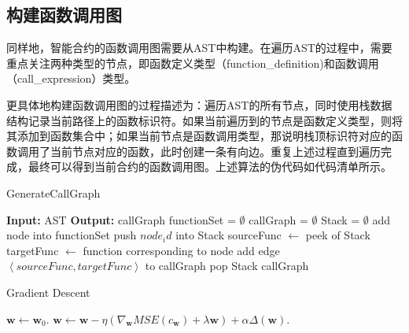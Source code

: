 \subsection{构建函数调用图}
\label{sec:构建函数调用图}
同样地，智能合约的函数调用图需要从AST中构建。在遍历AST的过程中，需要重点关注两种类型的节点，即函数定义类型（function\_definition)和函数调用（call\_expression）类型。

更具体地构建函数调用图的过程描述为：遍历AST的所有节点，同时使用栈数据结构记录当前路径上的函数标识符。如果当前遍历到的节点是函数定义类型，则将其添加到函数集合中；如果当前节点是函数调用类型，那说明栈顶标识符对应的函数调用了当前节点对应的函数，此时创建一条有向边。重复上述过程直到遍历完成，最终可以得到当前合约的函数调用图。上述算法的伪代码如代码清单所示。


\begin{algorithm}
    \caption{GenerateCallGraph}
    \begin{algorithmic}[1]
        \State \textbf{Input:} AST
        \State \textbf{Output:} callGraph
        \State functionSet = $\emptyset$
        \State callGraph = $\emptyset$
        \State Stack = $\emptyset$
                \State add node into functionSet
                \State push $node_id$ into Stack
                    \State sourceFunc $\gets$ peek of Stack
                    \State targetFunc $\gets$ function corresponding to node
                    \State add edge  $\left\langle sourceFunc,targetFunc\right\rangle$ to callGraph
                \EndIf
            \EndIf
                \State {}
            \EndFor
                \State pop Stack
            \EndIf
        \EndFunction
        \State {}
        \State \Return callGraph
    \end{algorithmic}
    \end{algorithm}

    \begin{algorithm}
        \caption{Gradient Descent}
        \begin{algorithmic}[1]
          \State $\mathbf{w}\leftarrow \mathbf{w}_0.$
          \State $\mathbf{w}\leftarrow \mathbf{w}-\eta(\nabla_{\mathbf{w}}MSE(c_{\mathbf{w}})+\lambda\mathbf{w})+\alpha\Delta(\mathbf{w}).$
          \EndFor
          \EndProcedure
        \end{algorithmic}
      \end{algorithm}
